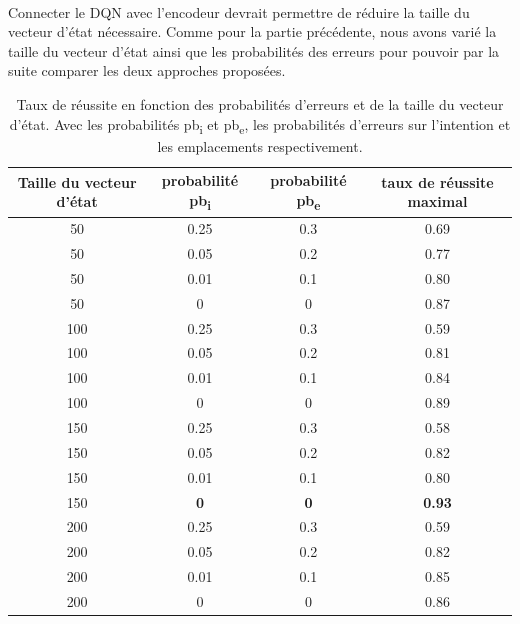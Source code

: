 \paragraph{} Connecter le DQN avec l'encodeur devrait permettre de réduire la taille du vecteur d'état nécessaire. Comme pour la partie précédente, nous avons varié la taille du vecteur d'état ainsi que les probabilités des erreurs pour pouvoir par la suite comparer les deux approches proposées. 
\begin{table}[H]
	\begin{center}
		
		\begin{tabular}{|c|c|c|c|}
			\hline
			\textbf{Taille du vecteur d'état} & \textbf{probabilité pb\textsubscript{i}} & \textbf{probabilité pb\textsubscript{e}} & \textbf{taux de réussite maximal}\\
			\hline
			50 & 0.25 & 0.3 & 0.69\\
			\hline
			50 & 0.05 & 0.2 & 0.77\\
			\hline
			50 & 0.01 & 0.1 & 0.80\\
			\hline
			50 & 0 & 0 & 0.87\\
			\hline
			100 & 0.25 & 0.3 & 0.59\\
			\hline
			100 & 0.05 & 0.2 & 0.81\\
			\hline
			100 & 0.01 & 0.1 & 0.84\\
			\hline
			100 & 0 & 0 & 0.89\\
			\hline
			150 & 0.25 & 0.3 & 0.58\\
			\hline
			150 & 0.05 & 0.2 & 0.82\\
			\hline
			150 & 0.01 & 0.1 & 0.80\\
			\hline
			150 & \textbf{0} & \textbf{0} & \textbf{0.93}\\
			\hline
			200 & 0.25 & 0.3 & 0.59\\
			\hline
			200 & 0.05 & 0.2 & 0.82\\
			\hline
			\rowcolor{LightCyan}
			200 & 0.01 & 0.1 & 0.85\\
			\hline
			200 & 0 & 0 & 0.86\\
			\hline
		\end{tabular}
		\caption{Taux de réussite en fonction des probabilités d'erreurs et de la taille du vecteur d'état. Avec les probabilités pb\textsubscript{i} et pb\textsubscript{e}, les probabilités d'erreurs sur l'intention et les emplacements respectivement.}\label{table_results_con}
	\end{center}
\end{table}
